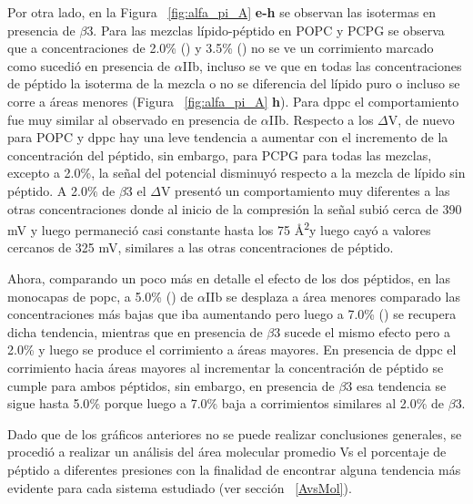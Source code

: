 {Por otra lado, en la Figura ~\ref{fig:alfa_pi_A} \textbf{e-h} se observan las isotermas en presencia de $\beta$3. Para las mezclas lípido-péptido en POPC y PCPG se observa que a concentraciones de 2.0\% (\textcolor{emerald}{})  y 3.5\% (\textcolor{falured}{}) no se ve un corrimiento marcado como sucedió en presencia de $\alpha$IIb, incluso se ve que en todas las concentraciones de péptido la isoterma de la mezcla o no se diferencia del lípido puro o incluso se corre a áreas menores (Figura ~\ref{fig:alfa_pi_A} \textbf{h}). Para \ac{dppc} el comportamiento fue muy similar al observado en presencia de $\alpha$IIb. Respecto a los $\Delta$V, de nuevo para \ac{POPC} y \ac{dppc} hay una leve tendencia a aumentar con el incremento de la concentración del péptido, sin embargo, para PCPG para todas las mezclas, excepto a 2.0\%, la señal del potencial disminuyó respecto a la mezcla de lípido sin péptido. A 2.0$\%$ de $\beta$3 el $\Delta$V presentó un comportamiento muy diferentes a las otras concentraciones donde al inicio de la compresión la señal subió cerca de 390 mV y luego permaneció casi constante hasta los 75 Å\textsuperscript{2}y luego cayó a valores cercanos de 325 mV, similares a las otras concentraciones de péptido.

Ahora, comparando un poco más en detalle el efecto de los dos péptidos,  en las monocapas de \ac{popc}, a 5.0\% (\textcolor{goldenpoppy}{\faCircle}) de $\alpha$IIb se desplaza a área menores comparado las concentraciones más bajas que iba aumentando pero luego a 7.0\% (\textcolor{deepmagenta}{\faCircle}) se recupera dicha tendencia, mientras que en presencia de $\beta$3 sucede el mismo efecto pero a 2.0\% y luego se produce el corrimiento a áreas mayores. En presencia de \ac{dppc} el corrimiento hacia áreas mayores al incrementar la concentración de péptido se cumple para ambos péptidos, sin embargo, en presencia de $\beta$3 esa tendencia se sigue hasta 5.0$\%$ porque luego a 7.0\% baja a corrimientos similares al 2.0\% de $\beta$3.

Dado que de los gráficos anteriores no se puede realizar conclusiones generales, se procedió a realizar un análisis del área molecular promedio Vs el porcentaje de péptido a diferentes presiones con la finalidad de encontrar alguna tendencia más evidente para cada sistema estudiado (ver sección ~\ref{AvsMol}).


    
}
